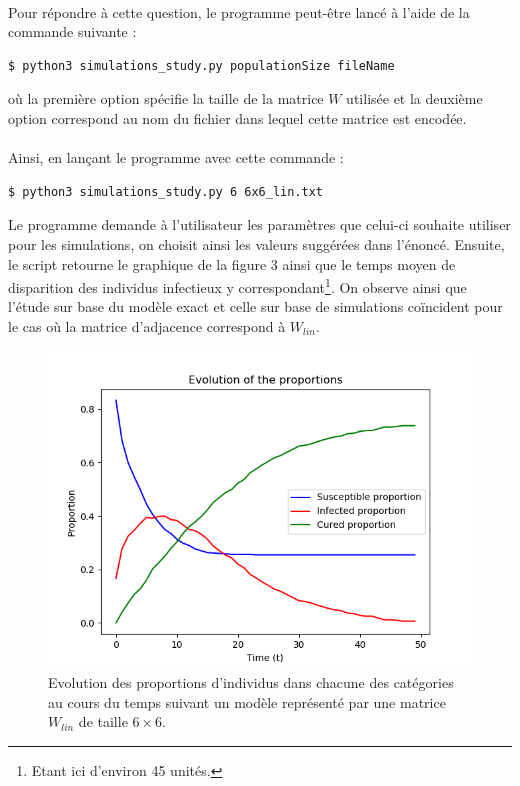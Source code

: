 \documentclass[a4paper, 12pt, oneside]{article}
\begin{document}
\paragraph{}Pour répondre à cette question, le programme peut-être lancé à l'aide de la commande suivante :
\begin{lstlisting}[language=bash]
$ python3 simulations_study.py populationSize fileName 
\end{lstlisting}
\noindent où la première option spécifie la taille de la matrice $W$ utilisée et la deuxième option correspond au nom du fichier dans lequel cette matrice est encodée.

\paragraph{}Ainsi, en lançant le programme avec cette commande :

\begin{lstlisting}[language=bash]
$ python3 simulations_study.py 6 6x6_lin.txt 
\end{lstlisting}

\noindent Le programme demande à l'utilisateur les paramètres que celui-ci souhaite utiliser pour les simulations, on choisit ainsi les valeurs suggérées dans l'énoncé. Ensuite, le script retourne le graphique de la figure 3 ainsi que le temps moyen de disparition des individus infectieux y correspondant\footnote{Etant ici d'environ 45 unités.}. On observe ainsi que l'étude sur base du modèle exact et celle sur base de simulations coïncident pour le cas où la matrice d'adjacence correspond à $W_{lin}$.

\begin{figure}[H]
	\centering
	\includegraphics[scale=1]{lin_6x6_simulations.png} 
	\caption{Evolution des proportions d'individus dans chacune des catégories au cours du temps suivant un modèle représenté par une matrice $W_{lin}$ de taille $6 \times 6$.}
\end{figure}
\end{document}
